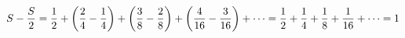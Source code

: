 \documentclass[preview]{standalone}
\begin{document}
\begin{align*}
\special{dvisvgm:raw <g id='unique000'>}S-\dfrac{S}{2}=\dfrac{1}{2}+\left(\dfrac{2}{4}-\dfrac{1}{4}\right)+\left(\dfrac{3}{8}-\dfrac{2}{8}\right)+\left(\dfrac{4}{16}-\dfrac{3}{16}\right)+\cdots=\dfrac{1}{2}+\dfrac{1}{4}+\dfrac{1}{8}+\dfrac{1}{16}+\cdots=1\special{dvisvgm:raw </g>}
\end{align*}
\end{document}
